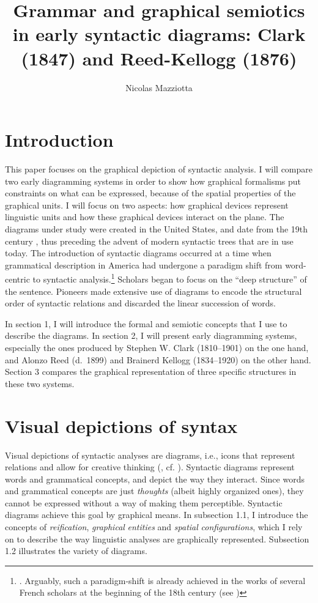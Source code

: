 \documentclass[output=paper]{langsci/langscibook}
\author{Nicolas Mazziotta}
\affiliation{Université de Liège}
\title{Grammar and graphical semiotics in early syntactic diagrams: Clark (1847) and Reed-Kellogg (1876)}
\begin{document}
\maketitle

\section*{Introduction} 

 This paper focuses on the graphical depiction of syntactic analysis. I will compare two early diagramming systems in order to show how graphical formalisms put constraints on what can be expressed, because of the spatial properties of the graphical units. I will focus on two aspects: how graphical devices represent linguistic units and how these graphical devices interact on the plane. The diagrams under study were created in the United States, and date from the 19th century \citep{brittain_critical_1973}, thus preceding the advent of modern syntactic trees that are in use today. The introduction of syntactic diagrams occurred at a time when grammatical description in America had undergone a paradigm shift from word-centric to syntactic analysis.\footnote{\textrm{\citet[76]{aarts_handbook_2006}. Arguably, such a paradigm-shift is already achieved in the works of several French scholars at the beginning of the 18th century (see \citealt{imrenyi_how_2020})}} Scholars began to focus on the “deep structure” of the sentence. Pioneers made extensive use of diagrams to encode the structural order of syntactic relations and discarded the linear succession of words. 

In section 1, I will introduce the formal and semiotic concepts that I use to describe the diagrams. In section 2, I will present early diagramming systems, especially the ones produced by Stephen W. Clark (1810–1901) on the one hand, and Alonzo Reed (d.~1899) and Brainerd Kellogg (1834–1920) on the other hand. Section 3 compares the graphical representation of three specific structures in these two systems.

\section{Visual depictions of syntax}

Visual depictions of syntactic analyses are diagrams, i.e., icons that represent relations and allow for creative thinking (\citealt{peirce_collected_1994}, cf. \citealt[36-42]{chauvire_oeil_2008}). Syntactic diagrams represent words and grammatical concepts, and depict the way they interact. Since words and grammatical concepts are just \textit{thoughts} (albeit highly organized ones), they cannot be expressed without a way of making them perceptible. Syntactic diagrams achieve this goal by graphical means. In subsection 1.1, I introduce the concepts of \textit{reification}, \textit{graphical} \textit{entities} and \textit{spatial} \textit{configurations}, which I rely on to describe the way linguistic analyses are graphically represented. Subsection 1.2 illustrates the variety of diagrams. 
\end{document}
